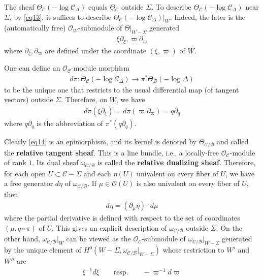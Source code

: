 \documentclass[11pt,b5paper,notitlepage]{article}
\theoremstyle{definition}
\theoremstyle{plain}
\newcommand{\<}{\left\langle}
\renewcommand{\>}{\right\rangle}
\newcommand{\MO}{\mathcal{O}}
\newcommand{\MC}{\mathcal{C}}
\newcommand{\MB}{\mathcal{B}}
\numberwithin{equation}{section}
\begin{document}
The sheaf $\Theta_\MC(-\log\MC_\Delta)$ equals $\Theta_\MC$ outside $\Sigma$. To describe $\Theta_\MC(-\log\MC_\Delta)$ near $\Sigma$, by \eqref{eq13}, it suffices to describe $\Theta_\MC(-\log\MC_\Delta)|_W$. Indeed, the later is the (automatically free) $\MO_W$-submodule of $\Theta|_{W-\Sigma}$ generated 
\begin{align}\label{eq34}
\xi\partial_\xi,\varpi\partial_\varpi
\end{align}
where $\partial_\xi,\partial_\varpi$ are defined under the coordinate $(\xi,\varpi)$ of $W$.


One can define an $\MO_\MC$-module morphism
\begin{align}\label{eq14}
d\pi:\Theta_\MC(-\log\MC_\Delta)\rightarrow\pi^*\Theta_\MB(-\log\Delta)
\end{align}
to be the unique one that restricts to the usual differential map (of tangent vectors) outside $\Sigma$. Therefore, on $W$, we have
\begin{align}\label{eq73}
d\pi(\xi\partial_\xi)=d\pi(\varpi\partial_\varpi)=q\partial_q
\end{align}
where $q\partial_q$ is the abbreviation of $\pi^*(q\partial_q)$. 

Clearly \eqref{eq14} is an epimorphism, and its kernel is denoted by $\Theta_{\MC/\MB}$ and called the \textbf{relative tangent sheaf}. This is a line bundle, i.e., a locally-free $\MO_\MC$-module of rank $1$. Its dual sheaf $\omega_{\MC/\MB}$ is called the \textbf{relative dualizing sheaf}. Therefore, for each open $U\subset \MC-\Sigma$ and each $\eta(U)$ univalent on every fiber of $U$, we have a free generator $d\eta$ of $\omega_{\MC/\MB}$. If $\mu\in\MO(U)$ is also univalent on every fiber of $U$, then
\begin{align}
d\eta=(\partial_\mu\eta)\cdot d\mu
\end{align} 
where the partial derivative is defined with respect to the set of coordinates $(\mu,q\circ\pi)$ of $U$. This gives an explicit description of $\omega_{\MC/\MB}$ outside $\Sigma$. On the other hand,  $\omega_{\MC/\MB}|_W$ can be viewed as the $\MO_\MC$-submodule of $\omega_{\MC/\MB}|_{W-\Sigma}$ generated by the unique element of $H^0(W-\Sigma,\omega_{\MC/\MB}|_{W-\Sigma})$ whose restriction to $W'$ and $W''$ are
\begin{align}\label{eq18}
\xi^{-1}d\xi\qquad\text{resp.}\qquad -\varpi^{-1}d\varpi
\end{align}
\end{document}
